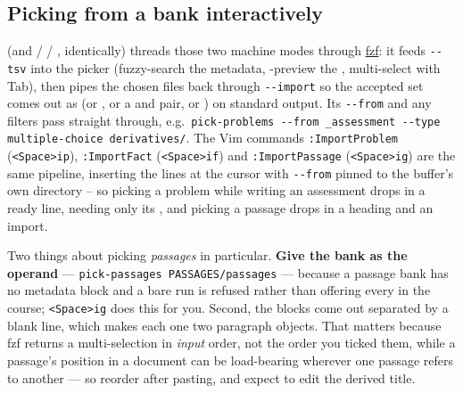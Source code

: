 \subsection{Picking from a bank interactively}

 (and  /  /
, identically)
threads those two
machine modes through
\href{https://github.com/junegunn/fzf}{fzf}: it feeds \texttt{-{}-tsv} into the
picker (fuzzy-search the metadata, -preview the ,
multi-select with Tab), then pipes the chosen files back through
\texttt{-{}-import} so the accepted set comes out as  (or
, or a  and  pair, or ) on
standard output. Its \texttt{-{}-from} and any  filters pass
straight through, e.g.\ \texttt{pick-problems -{}-from \_assessment -{}-type
multiple-choice derivatives/}. The Vim commands \texttt{:ImportProblem}
(\texttt{<Space>ip}), \texttt{:ImportFact} (\texttt{<Space>if}) and
\texttt{:ImportPassage} (\texttt{<Space>ig}) are the same
pipeline, inserting the lines at the cursor
with \texttt{-{}-from} pinned to the buffer's own directory -- so picking a
problem while writing an assessment drops in a ready line, needing only its
, and picking a passage drops in a heading and an import.

Two things about picking \emph{passages} in particular. \textbf{Give the bank as
the operand} --- \texttt{pick-passages PASSAGES/passages} --- because a passage
bank has no metadata block and a bare run is refused rather than offering every
 in the course; \texttt{<Space>ig} does this for you. Second, the
blocks come out separated by a blank line, which makes each one two paragraph
objects. That matters because fzf returns a multi-selection in \emph{input}
order, not the order you ticked them, while a passage's position in a document
can be load-bearing wherever one passage refers to another --- so reorder after
pasting, and expect to edit the derived title.
